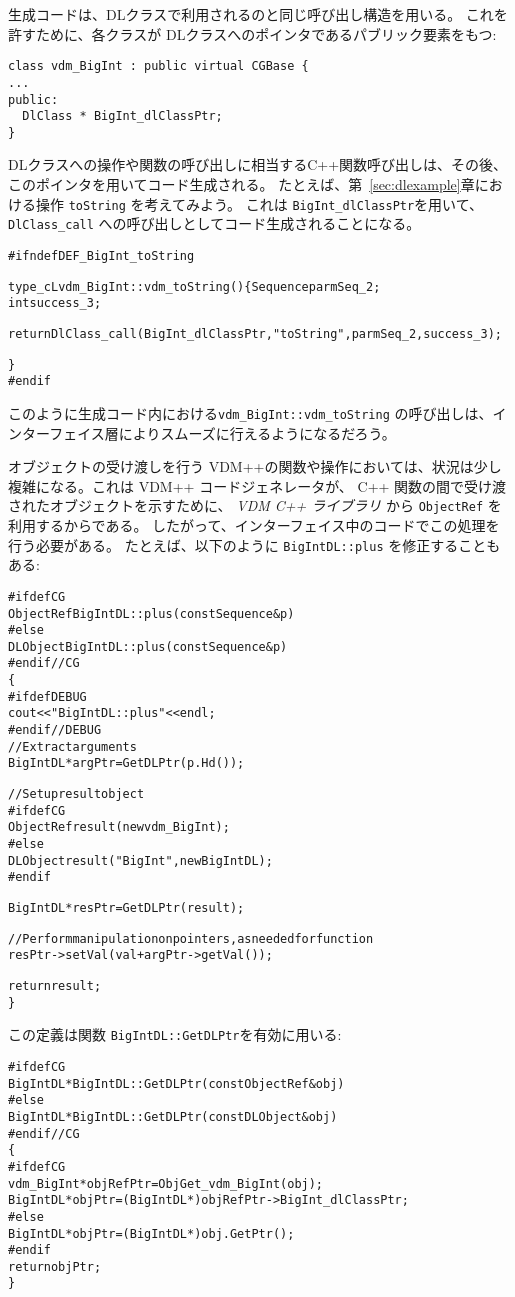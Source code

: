 \documentclass[\pformat,12pt]{jarticle}
\newcommand{\vdmcpplib}{\textit{VDM C++ ライブラリ}}
\begin{document}
生成コードは、DLクラスで利用されるのと同じ呼び出し構造を用いる。
これを許すために、各クラスが DLクラスへのポインタであるパブリック要素をもつ:
\begin{verbatim}
class vdm_BigInt : public virtual CGBase {
...
public:
  DlClass * BigInt_dlClassPtr;
}
\end{verbatim}
DLクラスへの操作や関数の呼び出しに相当するC++関数呼び出しは、その後、このポインタを用いてコード生成される。
たとえば、第~\ref{sec:dlexample}章における操作 \texttt{toString} を考えてみよう。
これは \texttt{BigInt\_dlClassPtr}を用いて、\texttt{DlClass\_call} への呼び出しとしてコード生成されることになる。
\begin{alltt}
\#ifndef DEF_BigInt_toString
 
type_cL vdm_BigInt::vdm_toString () \{  Sequence parmSeq_2;
  int success_3;
 
  return DlClass_call(BigInt_dlClassPtr, "toString", parmSeq_2, success_3);
 
\}
\#endif   
\end{alltt}
このように生成コード内における\texttt{vdm\_BigInt::vdm\_toString} の呼び出しは、インターフェイス層によりスムーズに行えるようになるだろう。

オブジェクトの受け渡しを行う VDM++の関数や操作においては、状況は少し複雑になる。これは VDM++ コードジェネレータが、 C++ 関数の間で受け渡されたオブジェクトを示すために、 {\vdmcpplib} から \texttt{ObjectRef} を利用するからである。 
したがって、インターフェイス中のコードでこの処理を行う必要がある。
たとえば、以下のように \texttt{BigIntDL::plus} を修正することもある:
\begin{alltt}
\#ifdef CG
ObjectRef BigIntDL::plus (const Sequence &p)
\#else
DLObject BigIntDL::plus (const Sequence &p)
\#endif //CG
\{
\#ifdef DEBUG
  cout << "BigIntDL::plus" << endl;
\#endif //DEBUG
  // Extract arguments
  BigIntDL *argPtr = GetDLPtr(p.Hd());

  // Set up result object
\#ifdef CG
  ObjectRef result (new vdm_BigInt);
\#else
  DLObject result("BigInt", new BigIntDL);
\#endif 

  BigIntDL *resPtr = GetDLPtr(result);

  // Perform manipulation on pointers, as needed for function
  resPtr->setVal( val + argPtr->getVal());

  return result;
\}
\end{alltt}
この定義は関数 \texttt{BigIntDL::GetDLPtr}を有効に用いる:
\begin{alltt}
\#ifdef CG
BigIntDL *BigIntDL::GetDLPtr(const ObjectRef& obj)
\#else
BigIntDL *BigIntDL::GetDLPtr(const DLObject& obj)
\#endif //CG
\{
\#ifdef CG
  vdm_BigInt *objRefPtr = ObjGet_vdm_BigInt(obj);
  BigIntDL *objPtr = (BigIntDL*) objRefPtr->BigInt_dlClassPtr;
\#else
  BigIntDL *objPtr = (BigIntDL*) obj.GetPtr(); 
\#endif
  return objPtr;
\}
\end{alltt}
\end{document}
